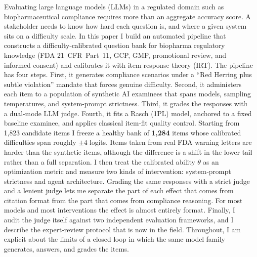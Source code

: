 Evaluating large language models (LLMs) in a regulated domain such as
biopharmaceutical compliance requires more than an aggregate accuracy
score. A stakeholder needs to know how hard each question is, and where a
given system sits on a difficulty scale. In this paper I build an
automated pipeline that constructs a difficulty-calibrated question bank
for biopharma regulatory knowledge (FDA 21~CFR~Part~11, GCP, GMP,
promotional review, and informed consent) and calibrates it with item
response theory (IRT). The pipeline has four steps. First, it generates
compliance scenarios under a ``Red Herring plus subtle violation''
mandate that forces genuine difficulty. Second, it administers each item
to a population of synthetic AI examinees that spans models, sampling
temperatures, and system-prompt strictness. Third, it grades the
responses with a dual-mode LLM judge. Fourth, it fits a Rasch (1PL)
model, anchored to a fixed baseline examinee, and applies classical
item-fit quality control. Starting from 1{,}823 candidate items I freeze
a healthy bank of \textbf{1{,}284} items whose calibrated difficulties
span roughly $\pm 4$ logits. Items taken from real FDA warning letters
are harder than the synthetic items, although the difference is a shift
in the lower tail rather than a full separation. I then treat the
calibrated ability $\theta$ as an optimization metric and measure two
kinds of intervention: system-prompt strictness and agent architecture.
Grading the same responses with a strict judge and a lenient judge lets
me separate the part of each effect that comes from citation format from
the part that comes from compliance reasoning. For most models and most
interventions the effect is almost entirely format. Finally, I audit the
judge itself against two independent evaluation frameworks, and I
describe the expert-review protocol that is now in the field. Throughout,
I am explicit about the limits of a closed loop in which the same model
family generates, answers, and grades the items.
